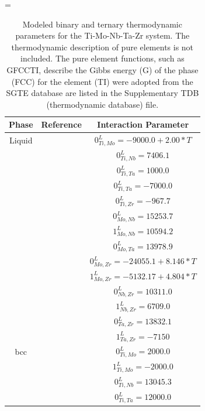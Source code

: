 \newpage
\LTcapwidth=\textwidth
\begin{longtable}[H]{ c c c }
	\caption{Modeled binary and ternary thermodynamic parameters for the Ti-Mo-Nb-Ta-Zr system. The thermodynamic description of pure elements is not included. The pure element functions, such as GFCCTI, describe the Gibbs energy (G) of the phase (FCC) for the element (TI) were adopted from the SGTE database \cite{Dinsdale1991} are listed in the Supplementary TDB (thermodynamic database) file.} \label{Ch3-table:ip}\\
		\hline
		Phase & Reference & Interaction Parameter\\
		\hline
		\endhead
		\hline
		\endfoot
		Liquid & \cite{Ansara1998} & $0^\textit{L}_{Ti,Mo} = -9000.0+2.00*T$\\
		          & \cite{Zhang2001} & $0^\textit{L}_{Ti,Nb} = 7406.1$\\
		          & \cite{Ansara1998} & $0^\textit{L}_{Ti,Ta} = 1000.0$\\
		          & \cite{Ansara1998} & $0^\textit{L}_{Ti,Ta} = -7000.0$\\
		          & \cite{Kumar1994a} & $0^\textit{L}_{Ti,Zr} = -967.7$\\
		          & \cite{Xiong2004} & $0^\textit{L}_{Mo,Nb} = 15253.7$\\
		          & \cite{Xiong2004} & $1^\textit{L}_{Mo,Nb} = 10594.2$\\
		          & \cite{Xiong2004} & $0^\textit{L}_{Mo,Ta} = 13978.9$\\
		          & \cite{Perez2003} & $0^\textit{L}_{Mo,Zr} = -24055.1+8.146*T$\\
		          & \cite{Perez2003} & $1^\textit{L}_{Mo,Zr} = -5132.17+4.804*T$\\
		          & \cite{Guillermet1991} & $0^\textit{L}_{Nb,Zr} = 10311.0$\\
		          & \cite{Guillermet1991} & $1^\textit{L}_{Nb,Zr} = 6709.0$\\
		          & \cite{Guillermet1995} & $0^\textit{L}_{Ta,Zr} = 13832.1$\\
		          & \cite{Guillermet1995} & $1^\textit{L}_{Ta,Zr} = -7150$\\
          bcc & \cite{Ansara1998} & $0^\textit{L}_{Ti,Mo} = 2000.0$\\
                  & \cite{Ansara1998} & $1^\textit{L}_{Ti,Mo} = -2000.0$\\
                  & \cite{Zhang2001} & $0^\textit{L}_{Ti,Nb} = 13045.3$\\
                  & \cite{Ansara1998} & $0^\textit{L}_{Ti,Ta} = 12000.0$\\

\end{longtable}

